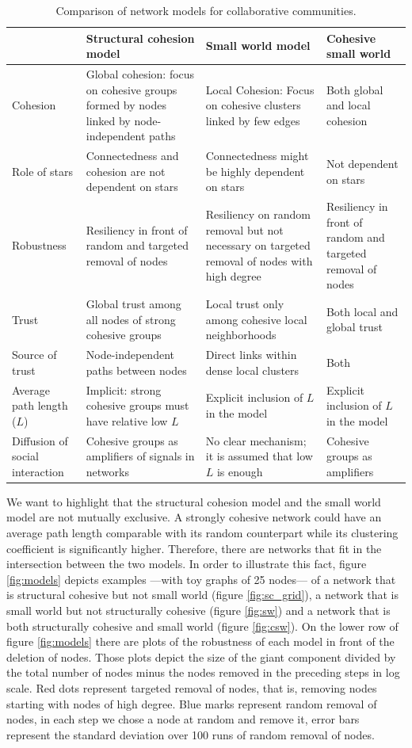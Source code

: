 \begin{table}[h]
\begin{tabular}{|p{2.5cm}|p{4.5cm}|p{4.5cm}|p{4cm}|}
\hline
&Structural cohesion model&Small world model& Cohesive small world\\
\hline
Cohesion&Global cohesion: focus on cohesive groups formed by nodes linked by node-independent paths&Local Cohesion: Focus on cohesive clusters linked by few edges&Both global and local cohesion\\
\hline
Role of stars&Connectedness and cohesion are not dependent on stars&Connectedness might be highly dependent on stars&Not dependent on stars\\
\hline
Robustness&Resiliency in front of random and targeted removal of nodes&Resiliency on random removal but not necessary on targeted removal of nodes with high degree&Resiliency in front of random and targeted removal of nodes\\
\hline
Trust&Global trust among all nodes of strong cohesive groups&Local trust only among cohesive local neighborhoods& Both local and global trust\\
\hline
Source of trust&Node-independent paths between nodes&Direct links within dense local clusters& Both\\
\hline
Average path length ($L$)&Implicit: strong cohesive groups must have relative low $L$&Explicit inclusion of $L$ in the model&Explicit inclusion of $L$ in the model\\
\hline
Diffusion of social interaction&Cohesive groups as amplifiers of signals in networks&No clear mechanism; it is assumed that low $L$ is enough&Cohesive groups as amplifiers\\
\hline
\end{tabular}
\caption{Comparison of network models for collaborative communities.}
\label{t:models}
\end{table}

We want to highlight that the structural cohesion model and the small world model are not mutually exclusive. A strongly cohesive network could have an average path length comparable with its random counterpart while its clustering coefficient is significantly higher. Therefore, there are networks that fit in the intersection between the two models. In order to illustrate this fact, figure \ref{fig:models} depicts examples ---with toy graphs of 25 nodes--- of a network that is structural cohesive but not small world (figure \ref{fig:sc_grid}), a network that is small world but not structurally cohesive (figure \ref{fig:sw}) and a network that is both structurally cohesive and small world (figure \ref{fig:csw}). On the lower row of figure \ref{fig:models} there are plots of the robustness of each model in front of the deletion of nodes. Those plots depict the size of the giant component divided by the total number of nodes minus the nodes removed in the preceding steps in log scale. Red dots represent targeted removal of nodes, that is, removing nodes starting with nodes of high degree. Blue marks represent random removal of nodes, in each step we chose a node at random and remove it, error bars represent the standard deviation over 100 runs of random removal of nodes.

